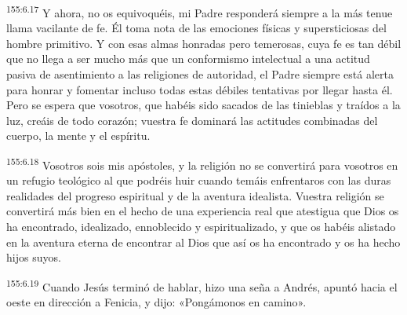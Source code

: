 \par
\textsuperscript{155:6.17} Y ahora, no os equivoquéis, mi Padre responderá siempre a la más tenue llama vacilante de fe. Él toma nota de las emociones físicas y supersticiosas del hombre primitivo. Y con esas almas honradas pero temerosas, cuya fe es tan débil que no llega a ser mucho más que un conformismo intelectual a una actitud pasiva de asentimiento a las religiones de autoridad, el Padre siempre está alerta para honrar y fomentar incluso todas estas débiles tentativas por llegar hasta él. Pero se espera que vosotros, que habéis sido sacados de las tinieblas y traídos a la luz, creáis de todo corazón; vuestra fe dominará las actitudes combinadas del cuerpo, la mente y el espíritu.

\par
\textsuperscript{155:6.18} Vosotros sois mis apóstoles, y la religión no se convertirá para vosotros en un refugio teológico al que podréis huir cuando temáis enfrentaros con las duras realidades del progreso espiritual y de la aventura idealista. Vuestra religión se convertirá más bien en el hecho de una experiencia real que atestigua que Dios os ha encontrado, idealizado, ennoblecido y espiritualizado, y que os habéis alistado en la aventura eterna de encontrar al Dios que así os ha encontrado y os ha hecho hijos suyos.

\par
\textsuperscript{155:6.19} Cuando Jesús terminó de hablar, hizo una seña a Andrés, apuntó hacia el oeste en dirección a Fenicia, y dijo: «Pongámonos en camino».